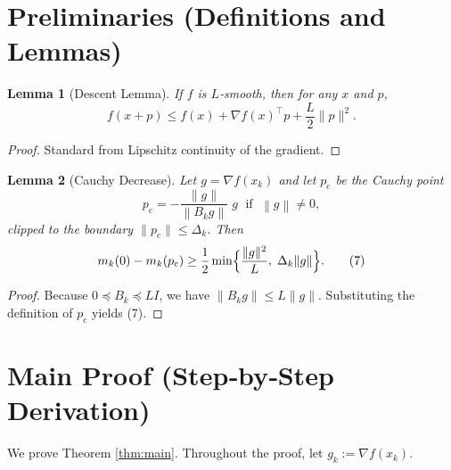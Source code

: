 \documentclass{article}
\newtheorem{lemma}{Lemma}
\newcommand{\norm}[1]{\left\lVert#1\right\rVert}
\begin{document}
\newpage
\section*{Preliminaries (Definitions and Lemmas)}
\begin{lemma}[Descent Lemma]\label{lem:descent}
If $f$ is $L$‑smooth, then for any $x$ and $p$,
\[
f(x+p)\le f(x)+\nabla f(x)^{\top}p+\frac{L}{2}\|p\|^{2}.
\tag{6}
\]
\end{lemma}
\begin{proof}
Standard from Lipschitz continuity of the gradient. \qedhere
\end{proof}
\begin{lemma}[Cauchy Decrease]\label{lem:cauchy}
Let $g=\nabla f(x_k)$ and let $p_{\mathrm{c}}$ be the Cauchy point
\[
p_{\mathrm{c}}=-\frac{\|g\|}{\norm{B_k g}}\;g\;\text{ if }\;\norm{g}\neq0,
\]
clipped to the boundary $\|p_{\mathrm{c}}\|\le\Delta_k$. Then
\[
m_k(0)-m_k(p_{\mathrm{c}})
\ge \frac12\min\Bigl\{\frac{\|g\|^{2}}{L},\;\Delta_k\|g\|\Bigr\}.
\tag{7}
\]
\end{lemma}
\begin{proof}
Because $0\preceq B_k\preceq L I$, we have $\|B_k g\|\le L\|g\|$. Substituting the definition of $p_{\mathrm{c}}$ yields (7). \qedhere
\end{proof}

\section*{Main Proof (Step‑by‑Step Derivation)}
We prove Theorem \ref{thm:main}. Throughout the proof, let $g_k:=\nabla f(x_k)$.
\end{document}
